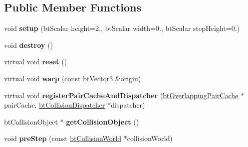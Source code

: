 \subsection*{Public Member Functions}
\begin{DoxyCompactItemize}
\item 
\hypertarget{class_dynamic_character_controller_aa426fc633e89fd28327080cea42de224}{void {\bfseries setup} (bt\+Scalar height=2., bt\+Scalar width=0., bt\+Scalar step\+Height=0.)}\label{class_dynamic_character_controller_aa426fc633e89fd28327080cea42de224}

\item 
\hypertarget{class_dynamic_character_controller_aa472be453b6934c14884722d80270c72}{void {\bfseries destroy} ()}\label{class_dynamic_character_controller_aa472be453b6934c14884722d80270c72}

\item 
\hypertarget{class_dynamic_character_controller_a44eb21ee4b713c3eb9f68337fc48061c}{virtual void {\bfseries reset} ()}\label{class_dynamic_character_controller_a44eb21ee4b713c3eb9f68337fc48061c}

\item 
\hypertarget{class_dynamic_character_controller_ab96c56c55c3fcdb8a616670ca814e344}{virtual void {\bfseries warp} (const bt\+Vector3 \&origin)}\label{class_dynamic_character_controller_ab96c56c55c3fcdb8a616670ca814e344}

\item 
\hypertarget{class_dynamic_character_controller_a6e214c5364fd44c063abd0a51bc29352}{virtual void {\bfseries register\+Pair\+Cache\+And\+Dispatcher} (\hyperlink{classbt_overlapping_pair_cache}{bt\+Overlapping\+Pair\+Cache} $\ast$pair\+Cache, \hyperlink{classbt_collision_dispatcher}{bt\+Collision\+Dispatcher} $\ast$dispatcher)}\label{class_dynamic_character_controller_a6e214c5364fd44c063abd0a51bc29352}

\item 
\hypertarget{class_dynamic_character_controller_a99c6678008bb0c92addfe9ad57c34ab6}{bt\+Collision\+Object $\ast$ {\bfseries get\+Collision\+Object} ()}\label{class_dynamic_character_controller_a99c6678008bb0c92addfe9ad57c34ab6}

\item 
\hypertarget{class_dynamic_character_controller_a0890086db2e74aab134b46f6f45b23ef}{void {\bfseries pre\+Step} (const \hyperlink{classbt_collision_world}{bt\+Collision\+World} $\ast$collision\+World)}\label{class_dynamic_character_controller_a0890086db2e74aab134b46f6f45b23ef}


\end{DoxyCompactItemize}
